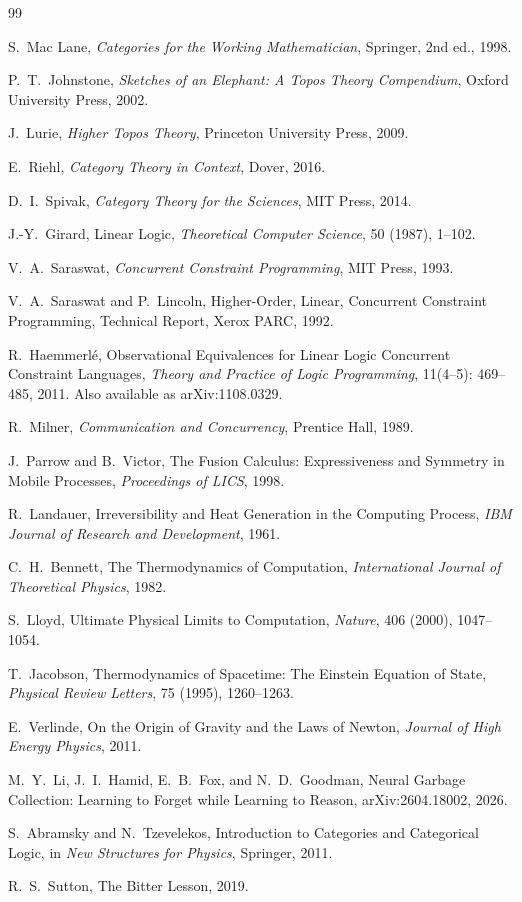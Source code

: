 \documentclass[11pt, letterpaper]{article}
\theoremstyle{plain}
\theoremstyle{definition}
\theoremstyle{remark}
\begin{document}
\newpage
\begin{thebibliography}{99}

S.~Mac Lane,
\textit{Categories for the Working Mathematician},
Springer, 2nd ed., 1998.

P.~T.~Johnstone,
\textit{Sketches of an Elephant: A Topos Theory Compendium},
Oxford University Press, 2002.

J.~Lurie,
\textit{Higher Topos Theory},
Princeton University Press, 2009.

E.~Riehl,
\textit{Category Theory in Context},
Dover, 2016.

D.~I.~Spivak,
\textit{Category Theory for the Sciences},
MIT Press, 2014.

J.-Y.~Girard,
Linear Logic,
\textit{Theoretical Computer Science}, 50 (1987), 1--102.

V.~A.~Saraswat,
\textit{Concurrent Constraint Programming},
MIT Press, 1993.

V.~A.~Saraswat and P.~Lincoln,
Higher-Order, Linear, Concurrent Constraint Programming,
Technical Report, Xerox PARC, 1992.

R.~Haemmerl\'e,
Observational Equivalences for Linear Logic Concurrent Constraint Languages,
\textit{Theory and Practice of Logic Programming},
11(4--5): 469--485, 2011.
Also available as arXiv:1108.0329.

R.~Milner,
\textit{Communication and Concurrency},
Prentice Hall, 1989.

J.~Parrow and B.~Victor,
The Fusion Calculus: Expressiveness and Symmetry in Mobile Processes,
\textit{Proceedings of LICS}, 1998.

R.~Landauer,
Irreversibility and Heat Generation in the Computing Process,
\textit{IBM Journal of Research and Development}, 1961.

C.~H.~Bennett,
The Thermodynamics of Computation,
\textit{International Journal of Theoretical Physics}, 1982.

S.~Lloyd,
Ultimate Physical Limits to Computation,
\textit{Nature}, 406 (2000), 1047--1054.

T.~Jacobson,
Thermodynamics of Spacetime: The Einstein Equation of State,
\textit{Physical Review Letters}, 75 (1995), 1260--1263.

E.~Verlinde,
On the Origin of Gravity and the Laws of Newton,
\textit{Journal of High Energy Physics}, 2011.

M.~Y.~Li, J.~I.~Hamid, E.~B.~Fox, and N.~D.~Goodman,
Neural Garbage Collection: Learning to Forget while Learning to Reason,
arXiv:2604.18002, 2026.

S.~Abramsky and N.~Tzevelekos,
Introduction to Categories and Categorical Logic,
in \textit{New Structures for Physics}, Springer, 2011.

R.~S.~Sutton,
The Bitter Lesson, 2019.

\end{thebibliography}
\end{document}

